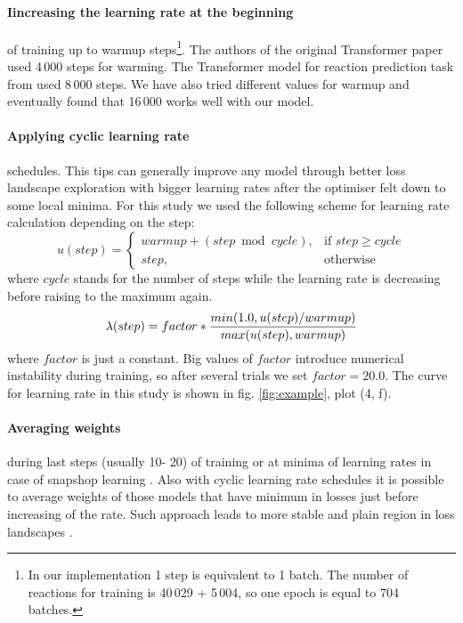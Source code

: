 \documentclass{article}
\begin{document}
\paragraph{Iincreasing the learning rate at the beginning} of training up to warmup steps\footnote{In our implementation 1 step is equivalent to 1 batch. The number of reactions for training is 40\,029 + 5\,004, so one epoch is equal to 704 batches.}. The authors of the original Transformer paper \cite{Transformer}  used 4\,000 steps for warming. The Transformer model for reaction prediction task from \cite{SchwallerTransformer} used 8\,000 steps. We have also tried different values for warmup and eventually found that 16\,000 works well with our model.
\paragraph{Applying cyclic learning rate} schedules. This tips can generally improve any model\cite{Izmailov} through better loss landscape exploration with bigger learning rates after the optimiser felt down to some local minima. For this study we used the following scheme for learning rate calculation depending on the step:
\[
    u(step)= 
\begin{cases}
    warmup + (step \bmod cycle), & \text{if } step \ge cycle\\
    step,              & \text{otherwise}
\end{cases}
\]
where $cycle$ stands for the number of steps while the learning rate is decreasing before raising to the maximum again.
\begin{equation}
\label{eq:rate}
\lambda(step) = factor * { {min (1.0, u(step) / warmup ) } \over { max (u(step), warmup) } }
\end{equation}	
where $factor$ is just a constant. Big values of $factor$ introduce numerical instability during training, so after several trials we set $factor = 20.0$. The curve for learning rate in this study is shown in fig. \ref{fig:example}, plot (4, f). 
\paragraph{Averaging weights} during last steps (usually 10- 20) of training or at minima of learning rates in case of snapshop learning \cite{Snapshot}. Also with cyclic learning rate schedules it is possible to average weights of those models that have minimum in losses just before increasing of the rate. Such approach leads to more stable and plain region in loss landscapes \cite{Izmailov}. 
\end{document}
